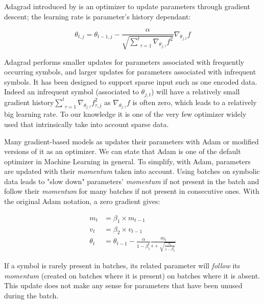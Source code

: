 Adagrad introduced by \cite{Adagrad} is an optimizer to update parameters through gradient descent; the learning rate is parameter's history dependant:

\begin{equation*}
    \theta_{t,j} = \theta_{t-1,j} - \frac{\alpha}{\sqrt{\underset{\tau = 1}{\overset{t}{\sum}} \nabla_{\theta_{j,\tau}}f^2}} \nabla_{\theta_{j,t}}f 
\end{equation*}

Adagrad performs smaller updates for parameters associated with frequently occurring symbols, and larger updates for parameters associated with infrequent symbols. It has been designed to support sparse input such as one encoded data. Indeed an infrequent symbol (associated to $\theta_{j,t}$) will have a relatively small gradient history$\underset{\tau = 1}{\overset{t}{\sum}} \nabla_{\theta_{j,\tau}}f^{2}_{\tau,j}$ as $\nabla_{\theta_{j,\tau}}f$ is often zero, which leads to a relatively big learning rate. To our knowledge it is one of the very few optimizer widely used that intrinsically take into account sparse data.

Many gradient-based models as \cite{OptimizerReview} updates their parameters with Adam \cite{adam} or modified versions of it \cite{adamw} \cite{nadam} as an optimizer. We can state that Adam is one of the default optimizer in Machine Learning in general. To simplify, with Adam, parameters are updated with their \textit{momentum} taken into account. Using batches on symbolic data leads to "slow down" parameters' \textit{momentum} if not present in the batch and follow their \textit{momentum} for many batches if not present in consecutive ones. With the original Adam notation, a zero gradient gives:


\begin{align*}
    m_{t} &= \beta_1 \times m_{t-1} \\
    v_{t} &= \beta_2 \times v_{t-1} \\
    \theta_t &= \theta_{t-1} - \frac{\alpha}{1 - \beta_1^t} \frac{m_t}{\epsilon + \sqrt{\frac{v_t}{1-\beta_2^t}}}
\end{align*}

If a symbol is rarely present in batches, its related parameter will \textit{follow} its \textit{momentum} (created on batches where it is present) on batches where it is absent. This update does not make any sense for parameters that have been unused during the batch.











